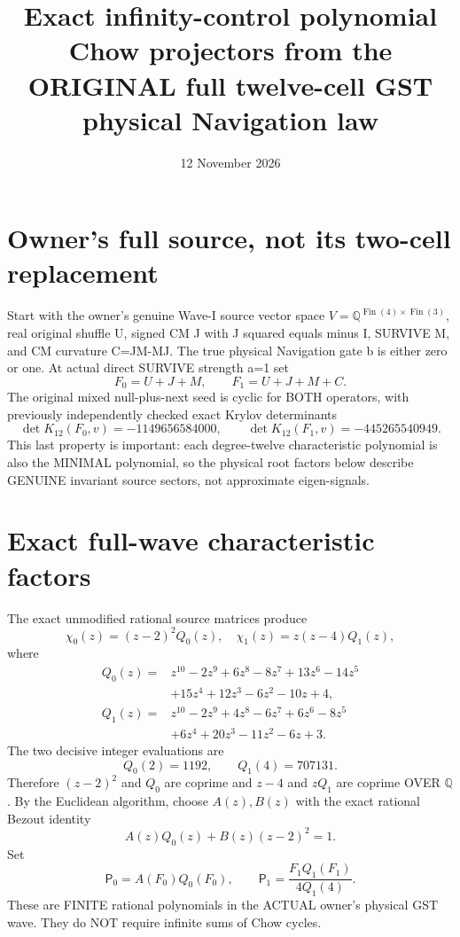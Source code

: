 \documentclass{article}
\title{Exact infinity-control polynomial Chow projectors from the ORIGINAL full twelve-cell GST physical Navigation law}
\date{12 November 2026}
\begin{document}
\maketitle

\section{Owner's full source, not its two-cell replacement}
Start with the owner's genuine Wave-I source vector space
$V=\mathbb Q^{\operatorname{Fin}(4)\times\operatorname{Fin}(3)}$,
real original shuffle U, signed CM J with J squared equals minus I,
SURVIVE M, and CM curvature C=JM-MJ.
The true physical Navigation gate b is either zero or one.
At actual direct SURVIVE strength a=1 set
\[
F_0=U+J+M,\qquad F_1=U+J+M+C.
\]
The original mixed null-plus-next seed is cyclic for
BOTH operators, with previously independently checked
exact Krylov determinants
\[
\det K_{12}(F_0,v)=-1149656584000,\qquad
\det K_{12}(F_1,v)=-445265540949.
\]
This last property is important: each degree-twelve
characteristic polynomial is also the MINIMAL polynomial,
so the physical root factors below describe GENUINE
invariant source sectors, not approximate eigen-signals.

\section{Exact full-wave characteristic factors}
The exact unmodified rational source matrices produce
\[
\boxed{\chi_0(z)=(z-2)^2Q_0(z),\quad
\chi_1(z)=z(z-4)Q_1(z),}
\]
where
\[
\begin{aligned}
Q_0(z)={}&z^{10}-2z^9+6z^8-8z^7+13z^6-14z^5\\
 &+15z^4+12z^3-6z^2-10z+4,\\
Q_1(z)={}&z^{10}-2z^9+4z^8-6z^7+6z^6-8z^5\\
 &+6z^4+20z^3-11z^2-6z+3.
\end{aligned}
\]
The two decisive integer evaluations are
\[
\boxed{Q_0(2)=1192,\qquad Q_1(4)=707131.}
\]
Therefore $(z-2)^2$ and $Q_0$ are coprime
and $z-4$ and $zQ_1$ are coprime OVER $\mathbb Q$.
By the Euclidean algorithm, choose $A(z),B(z)$
with the exact rational Bezout identity
\[
A(z)Q_0(z)+B(z)(z-2)^2=1.
\]
Set
\[
\boxed{
\mathsf P_0=A(F_0)Q_0(F_0),\qquad
\mathsf P_1=\frac{F_1Q_1(F_1)}{4Q_1(4)}.
}
\]
These are FINITE rational polynomials in
the ACTUAL owner's physical GST wave.
They do NOT require infinite sums of Chow cycles.
\end{document}
